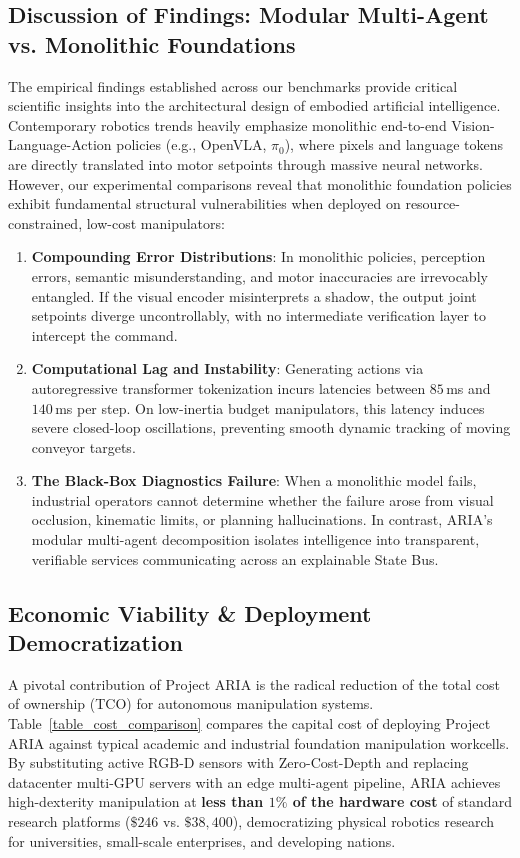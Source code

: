 \documentclass[journal]{IEEEtran}
\begin{document}
\subsection{Discussion of Findings: Modular Multi-Agent vs. Monolithic Foundations}
The empirical findings established across our benchmarks provide critical scientific insights into the architectural design of embodied artificial intelligence. Contemporary robotics trends heavily emphasize monolithic end-to-end Vision-Language-Action policies (e.g., OpenVLA, $\pi_0$), where pixels and language tokens are directly translated into motor setpoints through massive neural networks. However, our experimental comparisons reveal that monolithic foundation policies exhibit fundamental structural vulnerabilities when deployed on resource-constrained, low-cost manipulators:
\begin{enumerate}
    \item \textbf{Compounding Error Distributions}: In monolithic policies, perception errors, semantic misunderstanding, and motor inaccuracies are irrevocably entangled. If the visual encoder misinterprets a shadow, the output joint setpoints diverge uncontrollably, with no intermediate verification layer to intercept the command.
    \item \textbf{Computational Lag and Instability}: Generating actions via autoregressive transformer tokenization incurs latencies between $85$\,ms and $140$\,ms per step. On low-inertia budget manipulators, this latency induces severe closed-loop oscillations, preventing smooth dynamic tracking of moving conveyor targets.
    \item \textbf{The Black-Box Diagnostics Failure}: When a monolithic model fails, industrial operators cannot determine whether the failure arose from visual occlusion, kinematic limits, or planning hallucinations. In contrast, ARIA's modular multi-agent decomposition isolates intelligence into transparent, verifiable services communicating across an explainable State Bus.
\end{enumerate}

\subsection{Economic Viability \& Deployment Democratization}
A pivotal contribution of Project ARIA is the radical reduction of the total cost of ownership (TCO) for autonomous manipulation systems. Table~\ref{table_cost_comparison} compares the capital cost of deploying Project ARIA against typical academic and industrial foundation manipulation workcells. By substituting active RGB-D sensors with Zero-Cost-Depth and replacing datacenter multi-GPU servers with an edge multi-agent pipeline, ARIA achieves high-dexterity manipulation at \textbf{less than $1\%$ of the hardware cost} of standard research platforms ($\$246$ vs. $\$38,400$), democratizing physical robotics research for universities, small-scale enterprises, and developing nations.
\end{document}
